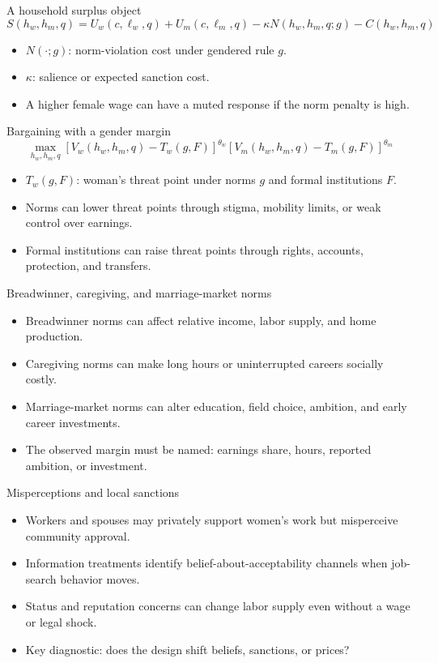 \documentclass[aspectratio=169,11pt]{beamer}
\begin{document}
\begin{frame}{A household surplus object}
\[
S(h_w,h_m,q)
=
U_w(c,\ell_w,q)
+
U_m(c,\ell_m,q)
-
\kappa N(h_w,h_m,q;g)
-
C(h_w,h_m,q)
\]
\begin{itemize}
    \item \(N(\cdot;g)\): norm-violation cost under gendered rule \(g\).
    \item \(\kappa\): salience or expected sanction cost.
    \item A higher female wage can have a muted response if the norm penalty is high.
\end{itemize}
\end{frame}

\begin{frame}{Bargaining with a gender margin}
\[
\max_{h_w,h_m,q}
\left[V_w(h_w,h_m,q)-T_w(g,F)\right]^{\theta_w}
\left[V_m(h_w,h_m,q)-T_m(g,F)\right]^{\theta_m}
\]
\begin{itemize}
    \item \(T_w(g,F)\): woman's threat point under norms \(g\) and formal institutions \(F\).
    \item Norms can lower threat points through stigma, mobility limits, or weak control over earnings.
    \item Formal institutions can raise threat points through rights, accounts, protection, and transfers.
\end{itemize}
\end{frame}

\begin{frame}{Breadwinner, caregiving, and marriage-market norms}
\begin{itemize}
    \item Breadwinner norms can affect relative income, labor supply, and home production.
    \item Caregiving norms can make long hours or uninterrupted careers socially costly.
    \item Marriage-market norms can alter education, field choice, ambition, and early career investments.
    \item The observed margin must be named: earnings share, hours, reported ambition, or investment.
\end{itemize}
\end{frame}

\begin{frame}{Misperceptions and local sanctions}
\begin{itemize}
    \item Workers and spouses may privately support women's work but misperceive community approval.
    \item Information treatments identify belief-about-acceptability channels when job-search behavior moves.
    \item Status and reputation concerns can change labor supply even without a wage or legal shock.
    \item Key diagnostic: does the design shift beliefs, sanctions, or prices?
\end{itemize}
\end{frame}
\end{document}
